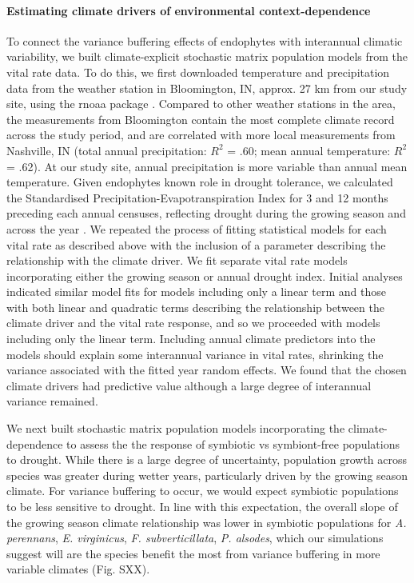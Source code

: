 \documentclass[12pt]{article}
\begin{document}
\paragraph*{Estimating climate drivers of environmental context-dependence}
To connect the variance buffering effects of endophytes with interannual climatic variability, we built climate-explicit stochastic matrix population models from the vital rate data.
To do this, we first downloaded temperature and precipitation data from the weather station in Bloomington, IN,  approx. 27 km from our study site, using the rnoaa package \cite{}. 
Compared to other weather stations in the area, the measurements from Bloomington contain the most complete climate record across the study period, and are correlated with more local measurements from Nashville, IN (total annual precipitation: $R^2$ = .60; mean annual temperature: $R^2$ = .62).
At our study site, annual precipitation is more variable than annual mean temperature.
Given endophytes known role in drought tolerance, we calculated the Standardised Precipitation-Evapotranspiration Index for 3 and 12 months preceding each annual censuses, reflecting drought during the growing season and across the year \cite{}.
We repeated the process of fitting statistical models for each vital rate as described above with the inclusion of a parameter describing the relationship with the climate driver. 
We fit separate vital rate models incorporating either the growing season or annual drought index.  
Initial analyses indicated similar model fits for models including only a linear term and those with both linear and  quadratic terms describing the relationship between the climate driver and the vital rate response, and so we proceeded with models including only the linear term.
Including annual climate predictors into the models should explain some interannual variance in vital rates, shrinking the variance associated with the fitted year random effects.
We found that the chosen climate drivers had predictive value although a large degree of interannual variance remained. 

We next built stochastic matrix population models incorporating the climate-dependence to assess the the response of symbiotic vs symbiont-free populations to drought. 
While there is a large degree of uncertainty, population growth across species was greater during wetter years, particularly driven by the growing season climate. 
For variance buffering to occur, we would expect symbiotic populations to be less sensitive to drought. 
In line with this expectation, the overall slope of the growing season climate relationship was lower in symbiotic populations for \emph{A. perennans}, \emph{E. virginicus}, \emph{F. subverticillata}, \emph{P. alsodes}, which our simulations suggest will are the species benefit the most from variance buffering in more variable climates (Fig. SXX).
\end{document}

